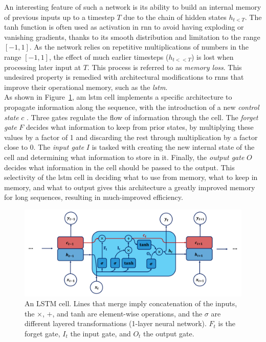 An interesting feature of such a network is its ability to build an internal memory of previous inputs up to a timestep $T$ due to the chain of hidden states $h_{t<T}$. The tanh function is often used as activation in \gls{rnn} to avoid having exploding or vanishing gradients, thanks to its smooth distribution and limitation to the range $[-1, 1]$. As the network relies on repetitive multiplications of numbers in the range $[-1, 1]$, the effect of much earlier timesteps ($h_{t<<T}$) is lost when processing later input at $T$. This process is referred to as \textit{memory loss}. This undesired property is remedied with architectural modifications to \glspl{rnn} that improve their operational memory, such as the \textit{\gls{lstm}}. \\

As shown in Figure~\ref{fig:lstmCell}, am \gls{lstm} cell implements a specific architecture to propagate information along the sequence, with the introduction of a new \textit{control state}  $c$ \cite{lstmPaper}. Three gates regulate the flow of information through the cell. The \textit{forget gate} $F$ decides what information to keep from prior states, by multiplying these values by a factor of 1 and discarding the rest through multiplication by a factor close to 0. The \textit{input gate} $I$ is tasked with creating the new internal state of the cell and determining what information to store in it. Finally, the \textit{output gate} $O$ decides what information in the cell should be passed to the output. This selectivity of the \gls{lstm} cell in deciding what to use from memory, what to keep in memory, and what to output gives this architecture a greatly improved memory for long sequences, resulting in much-improved efficiency. 

\begin{figure}[h!]
    \center
    \includegraphics[scale=0.5]{Images/ML/lstm.png}
    \caption{An LSTM cell. Lines that merge imply concatenation of the inputs, the $\times$, $+$, and tanh are element-wise operations, and the $\sigma$ are different layered transformations (1-layer neural network). $F_t$ is the forget gate, $I_t$ the input gate, and $O_t$ the output gate. } 
    \label{fig:lstmCell}
\end{figure}

